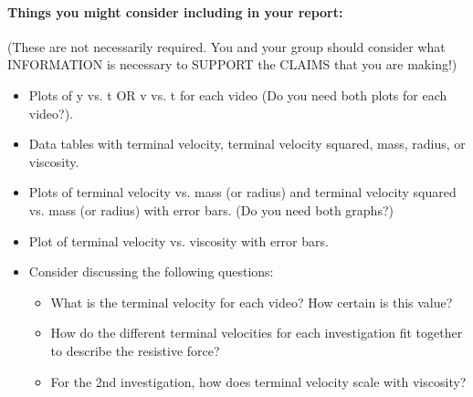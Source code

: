 \paragraph{Things you might consider including in your report:}
(These are not necessarily required. You and your group should consider what INFORMATION is necessary to SUPPORT the CLAIMS that you are making!)
\begin{itemize}
\item Plots of y vs. t OR v vs. t for each video (Do you need both plots for each video?).
\item Data tables with terminal velocity, terminal velocity squared, mass, radius, or viscosity.
\item Plots of terminal velocity vs. mass (or radius) and terminal velocity squared vs. mass (or radius) with error bars. (Do you need both graphs?)
\item Plot of terminal velocity vs. viscosity with error bars.
\item Consider discussing the following questions:
	\begin{itemize}
	\item What is the terminal velocity for each video? How certain is this value?
	\item How do the different terminal velocities for each investigation fit together to describe the resistive force?
	\item For the 2nd investigation, how does terminal velocity scale with viscosity?
	\end{itemize}
\end{itemize}

